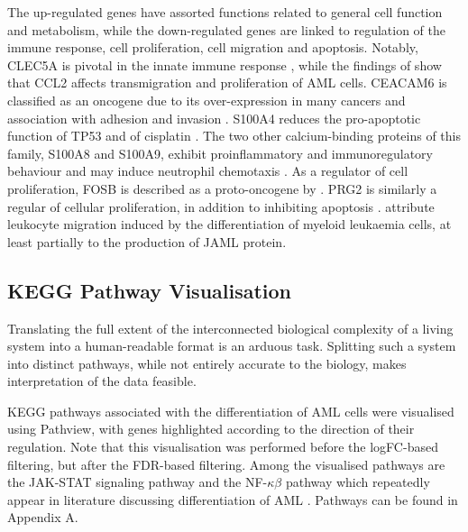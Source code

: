 The up-regulated genes have assorted functions related to general cell function and metabolism, while the down-regulated genes are linked to regulation of the immune response, cell proliferation, cell migration and apoptosis. Notably, CLEC5A is pivotal in the innate immune response \citep{chen2017clec5a}, while the findings of \cite{macanas2017ccl2} show that CCL2 affects transmigration and proliferation of \ac{AML} cells. CEACAM6 is classified as an oncogene due to its over-expression in many cancers and association with adhesion and invasion \citep{blumenthal2005inhibition}. S100A4 reduces the pro-apoptotic function of TP53 and of cisplatin \citep{orre2013s100a4}. The two other calcium-binding proteins of this family, S100A8 and S100A9, exhibit proinflammatory and immunoregulatory behaviour and may induce neutrophil chemotaxis \citep{ryckman2003proinflammatory}. As a regulator of cell proliferation, FOSB is described as a proto-oncogene by \cite{wisdom1993proto}. PRG2 is similarly a regular of cellular proliferation, in addition to inhibiting apoptosis \citep{hagihara2004identification, al2015restoration}. \cite{moog2003jaml} attribute leukocyte migration induced by the differentiation of myeloid leukaemia cells, at least partially to the production of JAML protein.



\subsection{KEGG Pathway Visualisation}
Translating the full extent of the interconnected biological complexity of a living system into a human-readable format is an arduous task. Splitting such a system into distinct pathways, while not entirely accurate to the biology, makes interpretation of the data feasible.

KEGG pathways associated with the differentiation of \ac{AML} cells were visualised using Pathview, with genes highlighted according to the direction of their regulation. Note that this visualisation was performed before the  \ac{logFC}-based filtering, but after the \ac{FDR}-based filtering. Among the visualised pathways are the JAK-STAT signaling pathway and the NF-$\kappa\beta$ pathway which repeatedly appear in literature discussing differentiation of \ac{AML} \citep{matikainen1997retinoic, gianni1997stat1, cohen2005jak, ren2013resveratrol, iwata2016parp9}. Pathways can be found in Appendix A.

